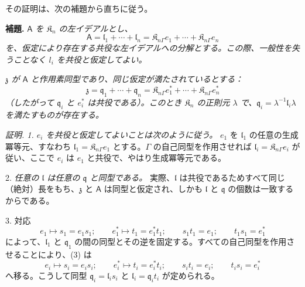 その証明は、次の補題から直ちに従う。

\textbf{補題.} \emph{\(\mathsf{A}\) を \(\mathfrak K_n\) の左イデアルとし、}
\[
\mathsf{A}=\mathfrak l_1+\cdots+\mathfrak l_n
=\mathfrak K_{n\Gamma}e_1+\cdots+\mathfrak K_{n\Gamma}e_n
\]
\emph{を、仮定により存在する共役な左イデアルへの分解とする。この際、一般性を失うことなく \(l_i\) を共役と仮定してよい。}

\emph{\(\mathfrak z\) が \(\mathsf{A}\) と作用素同型であり、同じ仮定が満たされているとする：}
\[
\mathfrak z=\mathfrak q_1+\cdots+\mathfrak q_n
=\mathfrak K_{n\Gamma}e_1^*+\cdots+\mathfrak K_{n\Gamma}e_n^*
\]
\emph{（したがって \(\mathfrak q_i\) と \(e_i^*\) は共役である）。このとき \(\mathfrak K_n\) の正則元 \(\lambda\) で、\(\mathfrak q_i=\lambda^{-1}\mathfrak l_i\lambda\) を満たすものが存在する。}

\emph{証明. 1. \(e_i\) を共役と仮定してよいことは次のように従う。} \(e_1\) を \(\mathfrak l_1\) の任意の生成冪等元、すなわち \(\mathfrak l_1=\mathfrak K_{n\Gamma}e_1\) とする。\(\Gamma\) の自己同型を作用させれば \(\mathfrak l_i=\mathfrak K_{n\Gamma}e_i\) が従い、ここで \(e_i\) は \(e_1\) と共役で、やはり生成冪等元である。

2. \emph{任意の \(\mathfrak l\) は任意の \(\mathfrak q\) と同型である。} 実際、\(\mathfrak l\) は共役であるためすべて同じ（絶対）長をもち、\(\mathfrak z\) と \(\mathsf{A}\) は同型と仮定され、しかも \(\mathfrak l\) と \(\mathfrak q\) の個数は一致するからである。

3. 対応
\[
\tag{3}
e_1\mapsto s_1=e_1s_1;\qquad
e_1^*\mapsto t_1=e_1^*t_1;\qquad
s_1t_1=e_1;\qquad
t_1s_1=e_1^*
\]
によって、\(\mathfrak l_1\) と \(\mathfrak q_1\) の間の同型とその逆を固定する。すべての自己同型を作用させることにより、(3) は
\[
e_i\mapsto s_i=e_is_i;\qquad
e_i^*\mapsto t_i=e_i^*t_i;\qquad
s_it_i=e_i;\qquad
t_is_i=e_i^*
\]
へ移る。こうして同型 \(\mathfrak q_i=\mathfrak l_is_i\) と \(\mathfrak l_i=\mathfrak q_it_i\) が定められる。

